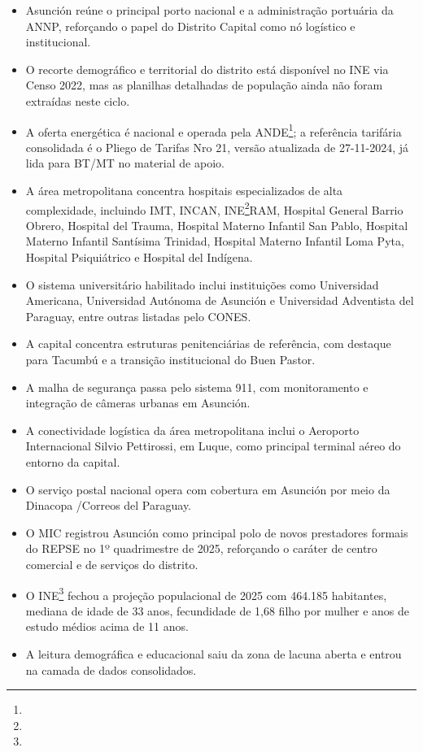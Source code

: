 \begin{itemize}
\tightlist
\item
  Asunción reúne o principal porto nacional e a administração portuária
  da ANNP, reforçando o papel do Distrito Capital como nó logístico e
  institucional.
\item
  O recorte demográfico e territorial do distrito está disponível no INE
  via Censo 2022, mas as planilhas detalhadas de população ainda não
  foram extraídas neste ciclo.
\item
  A oferta energética é nacional e operada pela ANDE\footnote{\fineANDE}; a referência
  tarifária consolidada é o Pliego de Tarifas Nro 21, versão atualizada
  de 27-11-2024, já lida para BT/\allowbreak \allowbreak MT no material de apoio.
\item
  A área metropolitana concentra hospitais especializados de alta
  complexidade, incluindo IMT, INCAN, INE\footnote{\fineINE}RAM, Hospital General Barrio
  Obrero, Hospital del Trauma, Hospital Materno Infantil San Pablo,
  Hospital Materno Infantil Santísima Trinidad, Hospital Materno
  Infantil Loma Pyta, Hospital Psiquiátrico e Hospital del Indígena.
\item
  O sistema universitário habilitado inclui instituições como
  Universidad Americana, Universidad Autónoma de Asunción e Universidad
  Adventista del Paraguay, entre outras listadas pelo CONES.
\item
  A capital concentra estruturas penitenciárias de referência, com
  destaque para Tacumbú e a transição institucional do Buen Pastor.
\item
  A malha de segurança passa pelo sistema 911, com monitoramento e
  integração de câmeras urbanas em Asunción.
\item
  A conectividade logística da área metropolitana inclui o Aeroporto
  Internacional Silvio Pettirossi, em Luque, como principal terminal
  aéreo do entorno da capital.
\item
  O serviço postal nacional opera com cobertura em Asunción por meio da
  Dinacopa /\allowbreak \allowbreak  Correos del Paraguay.
\item
  O MIC registrou Asunción como principal polo de novos prestadores
  formais do REPSE no 1º quadrimestre de 2025, reforçando o caráter de
  centro comercial e de serviços do distrito.
\item
  O INE\footnote{\fineINE} fechou a projeção populacional de 2025 com 464.185 habitantes,
  mediana de idade de 33 anos, fecundidade de 1,68 filho por mulher e
  anos de estudo médios acima de 11 anos.
\item
  A leitura demográfica e educacional saiu da zona de lacuna aberta e
  entrou na camada de dados consolidados.
\end{itemize}

